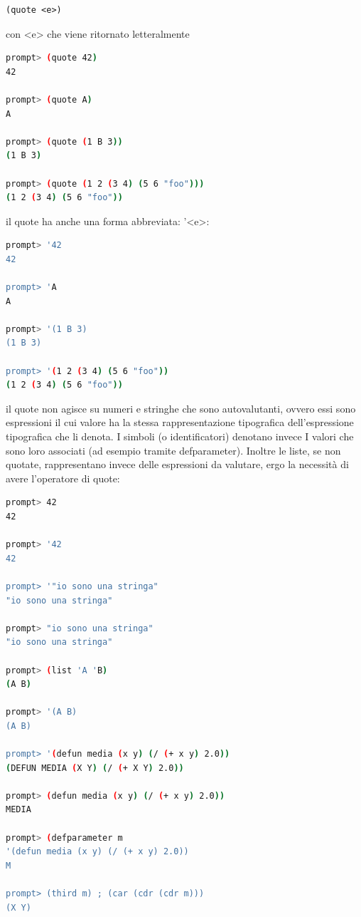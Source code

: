 \documentclass[a4paper,12pt, oneside]{book}
\begin{document}
\begin{verbatim}
(quote <e>)
\end{verbatim}
con <e> che viene ritornato letteralmente
\begin{shaded}
	\begin{lstlisting}[language=bash]
prompt> (quote 42)
42

prompt> (quote A)
A

prompt> (quote (1 B 3))
(1 B 3)

prompt> (quote (1 2 (3 4) (5 6 "foo")))
(1 2 (3 4) (5 6 "foo"))
\end{lstlisting}
\end{shaded}
il quote ha anche una forma abbreviata: '<e>:
\begin{shaded}
	\begin{lstlisting}[language=bash]
prompt> '42 
42

prompt> 'A
A

prompt> '(1 B 3)
(1 B 3)

prompt> '(1 2 (3 4) (5 6 "foo"))
(1 2 (3 4) (5 6 "foo"))
\end{lstlisting}
\end{shaded}
il quote non agisce su numeri e stringhe che sono autovalutanti, ovvero essi sono
espressioni il cui valore ha la stessa rappresentazione tipografica dell'espressione
tipografica che li denota. I simboli (o identificatori) denotano invece I valori che sono loro associati (ad
esempio tramite defparameter). Inoltre le liste, se non quotate, rappresentano invece delle espressioni da valutare, ergo la
necessità di avere l'operatore di quote:
\begin{shaded}
	\begin{lstlisting}[language=bash]
prompt> 42
42

prompt> '42
42

prompt> '"io sono una stringa"
"io sono una stringa"

prompt> "io sono una stringa"
"io sono una stringa"

prompt> (list 'A 'B)
(A B)

prompt> '(A B)
(A B)

prompt> '(defun media (x y) (/ (+ x y) 2.0))
(DEFUN MEDIA (X Y) (/ (+ X Y) 2.0))

prompt> (defun media (x y) (/ (+ x y) 2.0))
MEDIA

prompt> (defparameter m
'(defun media (x y) (/ (+ x y) 2.0))
M

prompt> (third m) ; (car (cdr (cdr m)))
(X Y)
\end{lstlisting}
\end{shaded}
\end{document}
